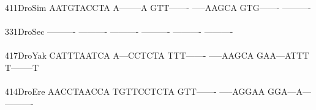 \documentclass[11pt,twoside,reqno,a4paper]{article}
\begin{document}
{411\hspace*{2\charwidth}DroSim	AATGTACCTA	A--------A	GTT-------	-----AAGCA	GTG-------	----------	\\
\hspace*{5\charwidth}\hspace*{7\charwidth}\hspace*{1\charwidth}\hspace*{1\charwidth}\hspace*{1\charwidth}\hspace*{1\charwidth}\hspace*{1\charwidth}\hspace*{1\charwidth}\\
331\hspace*{2\charwidth}DroSec	----------	----------	----------	----------	----------	----------	\\
\hspace*{5\charwidth}\hspace*{7\charwidth}\hspace*{1\charwidth}\hspace*{1\charwidth}\hspace*{1\charwidth}\hspace*{1\charwidth}\hspace*{1\charwidth}\hspace*{1\charwidth}\\
417\hspace*{2\charwidth}DroYak	CATTTAATCA	A---CCTCTA	TTT-------	-----AAGCA	GAA---ATTT	T--------T	\\
\hspace*{5\charwidth}\hspace*{7\charwidth}\hspace*{1\charwidth}\hspace*{1\charwidth}\hspace*{1\charwidth}\hspace*{1\charwidth}\hspace*{1\charwidth}\hspace*{1\charwidth}\\
414\hspace*{2\charwidth}DroEre	AACCTAACCA	TGTTCCTCTA	GTT-------	-----AGGAA	GGA---A---	----------	\\
\hspace*{5\charwidth}\hspace*{7\charwidth}\hspace*{1\charwidth}\hspace*{1\charwidth}\hspace*{1\charwidth}\hspace*{1\charwidth}\hspace*{1\charwidth}\hspace*{1\charwidth}\\
}
\end{document}
